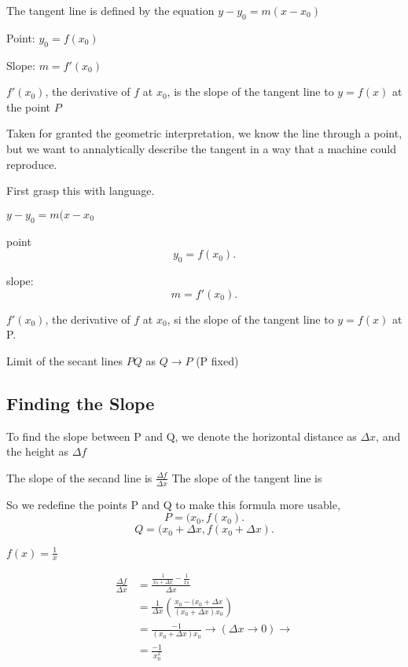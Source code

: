 \documentclass[a4paper,11pt,twoside]{report}
\begin{document}
The tangent line is defined by the equation $y-y_0=m(x-x_0)$

Point: $y_0=f(x_0)$

Slope: $m=f'(x_0)$

\begin{definition}[Derivative]
	$f'(x_0)$, the derivative of $f$ at $x_0$, is the slope
	of the tangent line to $y=f(x)$ at the point $P$
\end{definition}

Taken for granted the geometric interpretation, we know the line through a point,
but we want to annalytically describe the tangent in a way that a machine could reproduce.

First grasp this with language.

$y-y_0 = m(x-x_0$

point \[
	y_0 = f(x_0)
.\]

slope: \[
	m = f'(x_0)
.\]

\begin{definition}[Derivativ]
	$f'(x_0)$, the derivative of $f$ at $x_0$, si the slope of the tangent line to
	$y=f(x)$ at P.
\end{definition}

\begin{definition}
	Limit of the secant lines $PQ$ as $Q\to P$ (P fixed)
\end{definition}

\subsection{Finding the Slope}%
\label{sub:finding_the_slope}

To find the slope between P and Q, we denote the horizontal distance as $\Delta x$,
and the height as $\Delta f$

The slope of the secand line is $\frac{\Delta  f}{\Delta x}$
 The slope of the tangent line is


So we redefine the points P and Q to make this formula more usable, \[
	P = (x_0,f(x_0)
.\] \[
Q = (x_0 + \Delta x, f(x_0+\Delta x)
.\]

\begin{example}[Example 1]
	$f(x) = \frac{1}{x}$
\end{example}
\begin{solution}[Example 1]
	\begin{align*}
		\frac{\Delta f}{\Delta x} &= \frac{\frac{1}{x_0+\Delta x}- \frac{1}{x_0}}{\Delta x} \\
								  &= \frac{1}{\Delta x}\left( \frac{x_0-(x_0+\Delta x}{(x_0+\Delta x)x_0} \right) \\
								  &= \frac{-1}{(x_0+\Delta x)x_{0}} \to (\Delta x \to 0) \to \\
								  &= \frac{-1}{x_0^2}
\end{align*}
\end{solution}
\end{document}
